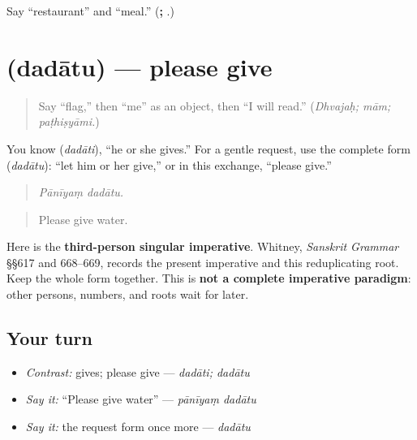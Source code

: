 \begin{tcolorbox}[breakable,colback=teal!4,colframe=teal!35!black,title={Before you move on}]
Say “restaurant” and “meal.” (\textbf{; }.)
\end{tcolorbox}
\section[\texorpdfstring{\sk{ददातु} (dadātu)}{ददातु (dadātu)}]{ (dadātu) — please give}

\label{lesson:SA-C265-dadatu}



\begin{quote}
Say “flag,” then “me” as an object, then “I will read.” (\emph{Dhvajaḥ; mām; paṭhiṣyāmi.})
\end{quote}

\begin{grammarlens}[title={Grammar Lens: one useful request form}]
You know \textbf{} (\emph{dadāti}), “he or she gives.” For a gentle request, use the complete form \textbf{} (\emph{dadātu}): “let him or her give,” or in this exchange, “please give.”

\begin{quote}
\textbf{ }
\end{quote}

\begin{quote}
\emph{Pānīyaṃ dadātu.}
\end{quote}

\begin{quote}
Please give water.
\end{quote}

Here \textbf{} is the \textbf{third-person singular imperative}. Whitney, \emph{Sanskrit Grammar} §§617 and 668–669, records the present imperative and this reduplicating root. Keep the whole form together. This is \textbf{not a complete imperative paradigm}: other persons, numbers, and roots wait for later.
\end{grammarlens}

\subsection*{Your turn}
\begin{itemize}
\raggedright
  \item \emph{Contrast:} gives; please give — \emph{dadāti; dadātu}
  \item \emph{Say it:} “Please give water” — \emph{pānīyaṃ dadātu}
  \item \emph{Say it:} the request form once more — \emph{dadātu}
\end{itemize}

